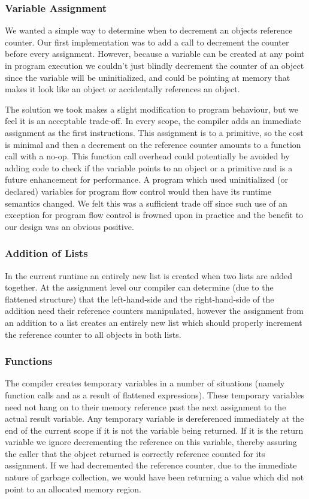 \documentclass{sigplanconf}
\begin{document}
\subsubsection{Variable Assignment}
We wanted a simple way to determine when to decrement an objects reference counter.  Our first implementation was to add a call to decrement the counter before every assignment.  However, because a variable can be created at any point in program execution we couldn't just blindly decrement the counter of an object since the variable will be uninitialized, and could be pointing at memory that makes it look like an object or accidentally references an object.
\par
The solution we took makes a slight modification to program behaviour, but we feel it is an acceptable trade-off.  In every scope, the compiler adds an immediate assignment as the first instructions.  This assignment is to a primitive, so the cost is minimal and then a decrement on the reference counter amounts to a function call with a no-op.  This function call overhead could potentially be avoided by adding code to check if the variable points to an object or a primitive and is a future enhancement for performance.  A program which used uninitialized (or declared) variables for program flow control would then have its runtime semantics changed.  We felt this was a sufficient trade off since such use of an exception for program flow control is frowned upon in practice and the benefit to our design was an obvious positive.

\subsubsection{Addition of Lists}
In the current runtime an entirely new list is created when two lists are added together.  At the assignment level our compiler can determine (due to the flattened structure) that the left-hand-side and the right-hand-side of the addition need their reference counters manipulated, however the assignment from an addition to a list creates an entirely new list which should properly increment the reference counter to all objects in both lists.

\subsubsection{Functions}

The compiler creates temporary variables in a number of situations (namely function calls and as a result of flattened expressions).  These temporary variables need not hang on to their memory reference past the next assignment to the actual result variable.  Any temporary variable is dereferenced immediately at the end of the current scope if it is not the variable being returned.  If it is the return variable we ignore decrementing the reference on this variable, thereby assuring the caller that the object returned is correctly reference counted for its assignment.  If we had decremented the reference counter, due to the immediate nature of garbage collection, we would have been returning a value which did not point to an allocated memory region.
\end{document}
